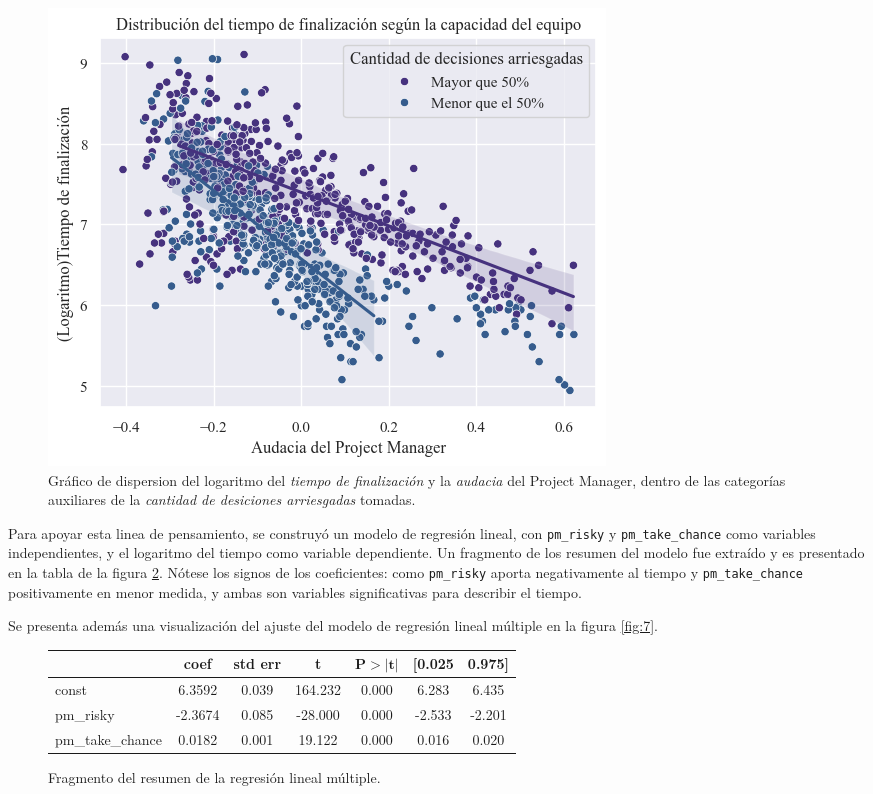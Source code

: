 \documentclass[a4paper, 12pt]{article}
\begin{document}
	\begin{figure}[htb!]
		\centering
		\includegraphics[height = .50\linewidth, width=.50\linewidth]{assets/risky_time_scatter}
		\caption{Gráfico de dispersion del logaritmo del  \emph{tiempo de finalización} y la \emph{audacia} del Project Manager, dentro de las categorías auxiliares de la \emph{cantidad de  desiciones arriesgadas} tomadas.}
		\label{fig:6}
	\end{figure}
	
	Para apoyar esta linea de pensamiento, se construyó un modelo de regresión lineal, con \texttt{pm\_risky} y \texttt{pm\_take\_chance} como variables independientes, y el logaritmo del tiempo como variable dependiente. Un fragmento de los resumen del modelo fue extraído y es presentado en la tabla de la figura \ref{table:1}. Nótese los signos de los coeficientes: como \texttt{pm\_risky} aporta negativamente al tiempo y \texttt{pm\_take\_chance} positivamente en menor medida, y ambas son variables significativas para describir el tiempo. 
	
	Se presenta además una visualización del ajuste del modelo de regresión lineal múltiple en la figura \ref{fig:7}.
	
	\begin{figure}[ht!]%
		\begin{center}
			\begin{tabular}{lcccccc}
				\hline
				\multicolumn{1}{c}{\textbf{}} & \multicolumn{1}{c}{\textbf{coef}} & \multicolumn{1}{c}{\textbf{std err}} &\multicolumn{1}{c}{\textbf{t}} &\multicolumn{1}{c}{$\boldsymbol{ P>|t| }$} & \multicolumn{1}{c}{\textbf{[0.025 }} &\multicolumn{1}{c}{\textbf{0.975]}} \\		                                                
				\hline	  		
				const           		    &      6.3592    &   0.039 &   164.232&      0.000&       6.283 &      6.435  \\
				pm\_risky       			  &      -2.3674  &    0.085    &-28.000   &   0.000   &   -2.533    &  -2.201     \\
				pm\_take\_chance	 &     0.0182      &    0.001     &19.122    &  0.000    &   0.016     &  0.020      \\
				\hline
			\end{tabular}
			\caption{Fragmento del resumen de la regresión lineal múltiple.\label{table:1}}
		\end{center}
	\end{figure}
\end{document}
